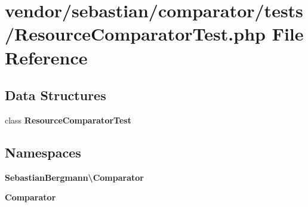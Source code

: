 \section{vendor/sebastian/comparator/tests/\+Resource\+Comparator\+Test.php File Reference}
\label{_resource_comparator_test_8php}
\subsection*{Data Structures}
\begin{DoxyCompactItemize}
\item 
class {\bf Resource\+Comparator\+Test}
\end{DoxyCompactItemize}
\subsection*{Namespaces}
\begin{DoxyCompactItemize}
\item 
 {\bf Sebastian\+Bergmann\textbackslash{}\+Comparator}
\item 
 {\bf Comparator}
\end{DoxyCompactItemize}
